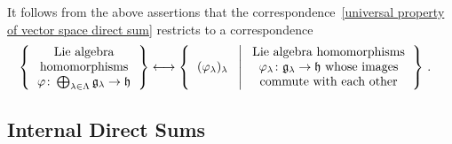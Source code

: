 \begin{example}
	It follows from the above assertions that the {\onetoonetext} correspondence~\eqref{universal property of vector space direct sum} restricts to a {\onetoonetext} correspondence
	\begin{align*}
		\left\{
			\begin{tabular}{c}
				Lie~algebra \\
				homomorphisms \\
				$\varphi \colon \bigoplus_{\lambda \in \Lambda} \glie_\lambda \to \hlie$
			\end{tabular}
		\right\}
		&\onetoone
		\left\{
			\begin{tabular}{c}
				$(\varphi_\lambda)_\lambda$
			\end{tabular}
		\suchthat*
			\begin{tabular}{c}
				Lie~algebra homomorphisms \\
				$\varphi_\lambda \colon \glie_\lambda \to \hlie$ whose images \\
				commute with each other
			\end{tabular}
		\right\} \,.
	\end{align*}
\end{example}


\subsection{Internal Direct Sums}


